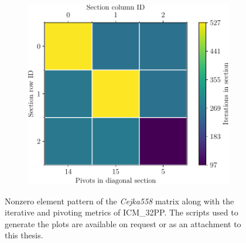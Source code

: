 \begin{figure}[ht!]
\begin{subfigure}[t]{0.51\textwidth}
		\includegraphics[width=\textwidth, keepaspectratio, clip]{images/ch03/input-matrices/decomposition-benchmarks/Cejka558_icm32pp_metrics.pdf}
		\label{Figure:comparing-decomposers-and-solvers->decomposition-project-benchmarks->decomposers-benchmark->comparison-of-execution-times-on-subset-of-matrices->ICMxPP-metrics->Cejka558}
	\end{subfigure}
	\caption{Nonzero element pattern of the \textit{Cejka558} matrix along with the iterative and pivoting metrics of ICM\_32PP.
		The scripts used to generate the plots are available on request or as an attachment to this thesis.
	}
	\label{Figure:comparing-decomposers-and-solvers->decomposition-project-benchmarks->decomposers-benchmark->comparison-of-execution-times-on-subset-of-matrices->matrix-with-metrics->Cejka558}
\end{figure}

